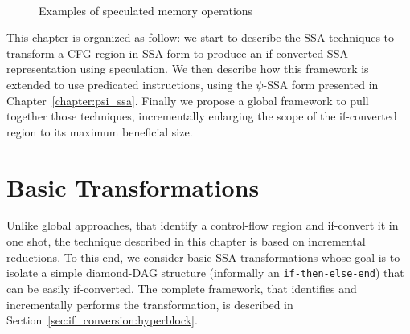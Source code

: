 \begin{figure}[h]
\hfill
{}\\
\hfill
{}
\caption{Examples of speculated memory operations}
\label{fig:spec}
\end{figure}




This chapter is organized as follow: we start to describe the SSA techniques to transform a CFG region in SSA form to produce an if-converted SSA representation using speculation. We then describe how this framework is extended to use predicated instructions, using the $\psi$-SSA form presented in Chapter~\ref{chapter:psi_ssa}. Finally we propose a global framework to pull together those techniques, incrementally enlarging the scope of the if-converted region to its maximum beneficial size.

\section{Basic Transformations}
\label{sec:basic}

Unlike global approaches, that identify a control-flow region and if-convert it in one shot, the technique described in this chapter is based on incremental reductions. To this end, we consider basic SSA transformations whose goal is to isolate a simple diamond-DAG structure (informally an \texttt{if-then-else-end}) that can be easily if-converted. The complete framework, that identifies and incrementally performs the transformation, is described in Section~\ref{sec:if_conversion:hyperblock}. 

